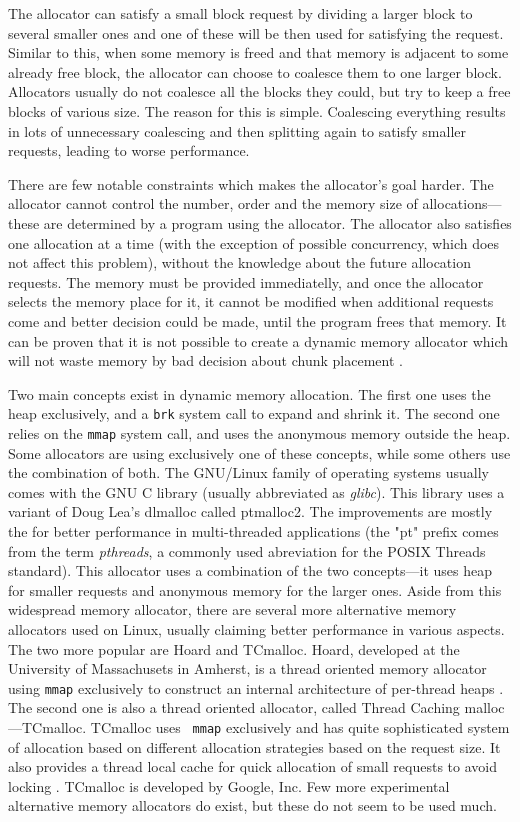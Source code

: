 The allocator can satisfy a small block request by dividing a larger block to
several smaller ones and one of these will be then used for satisfying the
request. Similar to this, when some memory is freed and that memory is adjacent
to some already free block, the allocator can choose to coalesce them to one
larger block. Allocators usually do not coalesce all the blocks they could, but
try to keep a free blocks of various size. The reason for this is simple.
Coalescing everything results in lots of unnecessary coalescing and then
splitting again to satisfy smaller requests, leading to worse performance.

There are few notable constraints which makes the allocator's goal harder. The
allocator cannot control the number, order and the memory size of
allocations---these are determined by a program using the allocator. The
allocator also satisfies one allocation at a time (with the exception of possible
concurrency, which does not affect this problem), without the knowledge about the
future allocation requests. The memory must be provided immediatelly, and once
the allocator selects the memory place for it, it cannot be modified when
additional requests come and better decision could be made, until the program
frees that memory. It can be proven that it is not possible to create a dynamic
memory allocator which will not waste memory by bad decision about chunk
placement \cite{DSAsurvey}.

Two main concepts exist in dynamic memory allocation. The first one uses the heap
exclusively, and a {\tt brk} system call to expand and shrink it. The second one
relies on the {\tt mmap} system call, and uses the anonymous memory outside the
heap. Some allocators are using exclusively one of these concepts, while some
others use the combination of both. The GNU/Linux family of operating systems
usually comes with the GNU C library (usually abbreviated as {\em glibc}). This
library uses a variant of Doug Lea's dlmalloc called ptmalloc2. The improvements
are mostly the for better performance in multi-threaded applications (the "pt"
prefix comes from the term {\em pthreads}, a commonly used abreviation for the
POSIX Threads standard). This allocator uses a combination of the two
concepts---it uses heap for smaller requests and anonymous memory for the larger
ones. Aside from this widespread memory allocator, there are several more
alternative memory allocators used on Linux, usually claiming better performance
in various aspects. The two more popular are Hoard and TCmalloc. Hoard, developed
at the University of Massachusets in Amherst, is a thread oriented memory
allocator using {\tt mmap} exclusively to construct an internal architecture of
per-thread heaps \cite{allocators:hoard}. The second one is also a thread
oriented allocator, called Thread Caching malloc---TCmalloc. TCmalloc uses {\tt
mmap} exclusively and has quite sophisticated system of allocation based on
different allocation strategies based on the request size. It also provides a
thread local cache for quick allocation of small requests to avoid locking
\cite{tcmalloc}. TCmalloc is developed by Google, Inc. Few more experimental
alternative memory allocators do exist, but these do not seem to be used much.

